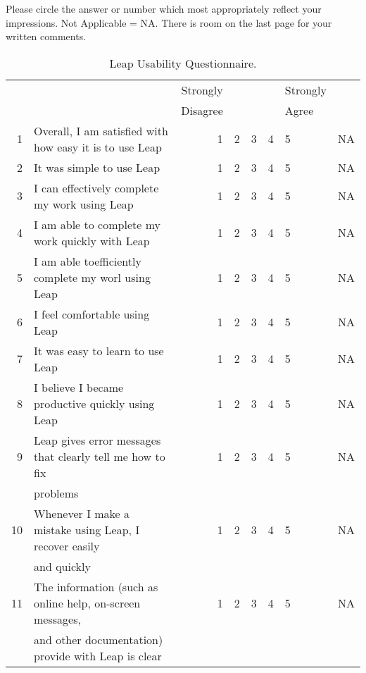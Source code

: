 
\label{sec:questionaire-usability}

Please circle the answer or number which most appropriately reflect your
impressions.  Not Applicable = NA.   There is room on the last page for your
written comments.\\
\begin{table}[htbp]
  \caption{Leap Usability Questionnaire.}  
  \begin{tabular}{rlrccclc}\\
    \hline
    &&Strongly&&&&Strongly&\\ 
    &&Disagree&&&&Agree&\\ \hline
    1&Overall, I am satisfied with how easy it is to use Leap&1&2&3&4&5&NA\\ \hline
    2&It was simple to use Leap&1&2&3&4&5&NA\\ \hline
    3&I can effectively complete my work using Leap&1&2&3&4&5&NA\\ \hline
    4&I am able to complete my work quickly with Leap&1&2&3&4&5&NA\\ \hline
    5&I am able toefficiently complete my worl using Leap&1&2&3&4&5&NA\\ \hline
    6&I feel comfortable using Leap&1&2&3&4&5&NA\\ \hline
    7&It was easy to learn to use Leap&1&2&3&4&5&NA\\ \hline
    8&I believe I became productive quickly using Leap&1&2&3&4&5&NA\\ \hline
    9&Leap gives error messages that clearly tell me how to fix&1&2&3&4&5&NA\\
    &problems\\ \hline 
    10&Whenever I make a mistake using Leap, I recover easily &1&2&3&4&5&NA\\ 
    &and quickly \\ \hline 
    11&The information (such as online help, on-screen messages,
    &1&2&3&4&5&NA\\ 
    &and other documentation) provide with Leap is clear \\ \hline

\end{tabular}
\end{table}
